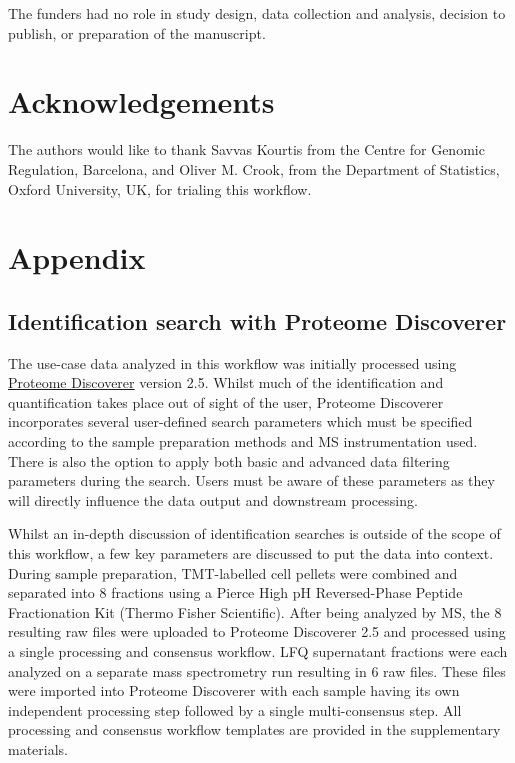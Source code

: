\documentclass[9pt,a4paper,]{extarticle}
\begin{document}
The funders had no role in study design, data collection and analysis, decision
to publish, or preparation of the manuscript.

\section{Acknowledgements}\label{acknowledgements}

The authors would like to thank Savvas Kourtis from the Centre for Genomic
Regulation, Barcelona, and Oliver M. Crook, from the Department of Statistics,
Oxford University, UK, for trialing this workflow.

\section{Appendix}\label{appendix}

\subsection{Identification search with Proteome Discoverer}\label{identification-search-with-proteome-discoverer}

The use-case data analyzed in this workflow was initially processed using
\href{https://www.thermofisher.com/uk/en/home/industrial/mass-spectrometry/liquid-chromatography-mass-spectrometry-lc-ms/lc-ms-software/multi-omics-data-analysis/proteome-discoverer-software.html}{Proteome Discoverer}
version 2.5. Whilst much of the identification and quantification takes place
out of sight of the user, Proteome Discoverer incorporates several user-defined
search parameters which must be specified according to the sample preparation
methods and MS instrumentation used. There is also the option to apply both
basic and advanced data filtering parameters during the search. Users must be
aware of these parameters as they will directly influence the data output and
downstream processing.

Whilst an in-depth discussion of identification searches is outside of the scope
of this workflow, a few key parameters are discussed to put the data into
context. During sample preparation, TMT-labelled cell pellets were combined and
separated into 8 fractions using a Pierce High pH Reversed-Phase Peptide
Fractionation Kit (Thermo Fisher Scientific). After being analyzed by MS, the 8
resulting raw files were uploaded to Proteome Discoverer 2.5 and processed using
a single processing and consensus workflow. LFQ supernatant fractions were each
analyzed on a separate mass spectrometry run resulting in 6 raw files. These
files were imported into Proteome Discoverer with each sample having its own
independent processing step followed by a single multi-consensus step. All
processing and consensus workflow templates are provided in the supplementary
materials.
\end{document}
